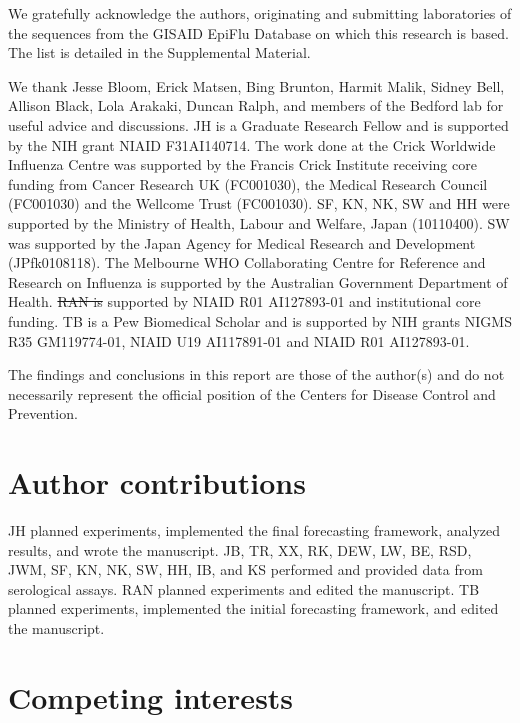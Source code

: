 \documentclass[9pt,lineno]{elife} %
\providecommand{\DIFadd}[1]{{\protect\color{blue}\uwave{#1}}} %
\providecommand{\DIFdel}[1]{{\protect\color{red}\sout{#1}}}                      %
\providecommand{\DIFaddbegin}{} %
\providecommand{\DIFaddend}{} %
\providecommand{\DIFdelbegin}{} %
\providecommand{\DIFdelend}{} %
\providecommand{\DIFaddtex}[1]{{\protect\color{blue}\uwave{#1}}} %
\providecommand{\DIFdeltex}[1]{{\protect\color{red}\sout{#1}}}                      %
\providecommand{\DIFaddbegin}{} %
\providecommand{\DIFaddend}{} %
\providecommand{\DIFdelbegin}{} %
\providecommand{\DIFdelend}{} %
\providecommand{\DIFadd}[1]{\texorpdfstring{\DIFaddtex{#1}}{#1}} %
\providecommand{\DIFdel}[1]{\texorpdfstring{\DIFdeltex{#1}}{}} %
\newcommand{\DIFscaledelfig}{0.5}
\newlength{\DIFdelgraphicswidth} %
\newlength{\DIFdelgraphicsheight} %
\newcommand{\DIFaddincludegraphics}[2][]{{\color{blue}\fbox{\DIFOincludegraphics[#1]{#2}}}} %
\newcommand{\DIFdelincludegraphics}[2][]{%
\sbox{\DIFdelgraphicsbox}{\DIFOincludegraphics[#1]{#2}}%
\settoboxwidth{\DIFdelgraphicswidth}{\DIFdelgraphicsbox} %
\settoboxtotalheight{\DIFdelgraphicsheight}{\DIFdelgraphicsbox} %
\scalebox{\DIFscaledelfig}{%
\parbox[b]{\DIFdelgraphicswidth}{\usebox{\DIFdelgraphicsbox}\\[-\baselineskip] \rule{\DIFdelgraphicswidth}{0em}}\llap{\resizebox{\DIFdelgraphicswidth}{\DIFdelgraphicsheight}{%
\setlength{\unitlength}{\DIFdelgraphicswidth}%
\begin{picture}(1,1)%
\thicklines\linethickness{2pt} %
{\color[rgb]{1,0,0}\put(0,0){\framebox(1,1){}}}%
{\color[rgb]{1,0,0}\put(0,0){\line( 1,1){1}}}%
{\color[rgb]{1,0,0}\put(0,1){\line(1,-1){1}}}%
\end{picture}%
}\hspace*{3pt}}} %
} %
\DeclareRobustCommand{\DIFaddbegin}{\DIFOaddbegin \let\includegraphics\DIFaddincludegraphics} %
\DeclareRobustCommand{\DIFaddend}{\DIFOaddend \let\includegraphics\DIFOincludegraphics} %
\DeclareRobustCommand{\DIFdelbegin}{\DIFOdelbegin \let\includegraphics\DIFdelincludegraphics} %
\DeclareRobustCommand{\DIFdelend}{\DIFOaddend \let\includegraphics\DIFOincludegraphics} %
\begin{document}
We gratefully acknowledge the authors, originating and submitting laboratories of the sequences from the GISAID EpiFlu Database \DIFdelbegin %
\DIFdelend \DIFaddbegin \citep{shu2017gisaid} \DIFaddend on which this research is based. The list is detailed in the Supplemental Material.

We thank Jesse Bloom, Erick Matsen, Bing Brunton, Harmit Malik, Sidney Bell, Allison Black, Lola Arakaki, Duncan Ralph, and members of the Bedford lab for useful advice and discussions.
JH is a Graduate Research Fellow and is supported by the NIH grant NIAID F31AI140714.
The work done at the Crick Worldwide Influenza Centre was supported by the Francis Crick Institute receiving core funding from Cancer Research UK (FC001030), the Medical Research Council (FC001030) and the Wellcome Trust (FC001030).
SF, KN, NK, SW and HH were supported by the Ministry of Health, Labour and Welfare, Japan (10110400).
SW was supported by the Japan Agency for Medical Research and Development (JPfk0108118).
The Melbourne WHO Collaborating Centre for Reference and Research on Influenza is supported by the Australian Government Department of Health.
\DIFdelbegin \DIFdel{RAN is }\DIFdelend \DIFaddbegin \DIFadd{PB and RAN are }\DIFaddend supported by NIAID R01 AI127893-01 and institutional core funding.
TB is a Pew Biomedical Scholar and is supported by NIH grants NIGMS R35 GM119774-01, NIAID U19 AI117891-01 and NIAID R01 AI127893-01.

The findings and conclusions in this report are those of the author(s) and do not necessarily represent the official position of the Centers for Disease Control and Prevention.

\section*{Author contributions}

JH planned experiments, implemented the final forecasting framework, analyzed results, and wrote the manuscript.
JB, TR, XX, RK, DEW, LW, BE, RSD, JWM, SF, KN, NK, SW, HH, IB, and KS performed and provided data from serological assays.
\DIFaddbegin \DIFadd{PB analyzed results.
}\DIFaddend RAN planned experiments and edited the manuscript.
TB planned experiments, implemented the initial forecasting framework, and edited the manuscript.

\section*{Competing interests}
\end{document}
